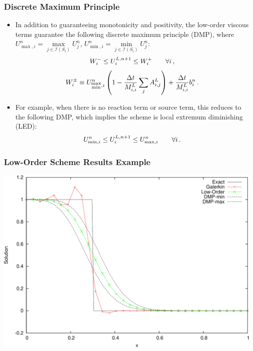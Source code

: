 \documentclass{beamer} \useoutertheme{infolines}
\begin{document}
\begin{frame}
\frametitle{Discrete Maximum Principle}

\begin{itemize}
   \item In addition to guaranteeing monotonicity and positivity, the low-order
      viscous terms guarantee the following discrete maximum principle (DMP),
      where $U^n_{\max,i} = \max\limits_{j\in\mathcal{I}(S_i)}U^n_j$,
      $U^n_{\min,i} = \min\limits_{j\in\mathcal{I}(S_i)}U^n_j$:
      \begin{equation}
         W_i^-\leq
         U_i^{L,n+1}\leq
         W_i^+\qquad\forall i \,,
      \end{equation}
      \begin{equation}
         W_i^\pm \equiv U_{\substack{\max\\\min},i}^n\left(
         1-\frac{\Delta t}{M_{i,i}^L}
         \sum\limits_j A_{i,j}^L\right)
         + \frac{\Delta t}{M_{i,i}^L}b_i^n \,.
      \end{equation}
   \item For example, when there is no reaction term or source term, this reduces
      to the following DMP, which implies the scheme is local extremum
      diminishing (LED):
      \begin{equation}
         U^n_{\min,i}\leq
         U_i^{L,n+1}\leq
         U^n_{\max,i}\qquad\forall i \,.
      \end{equation}
\end{itemize}

\end{frame}
\begin{frame}
\frametitle{Low-Order Scheme Results Example}

\includegraphics[width=\textwidth]{./figures/advection_low_order.pdf}

\end{frame}
\end{document}
